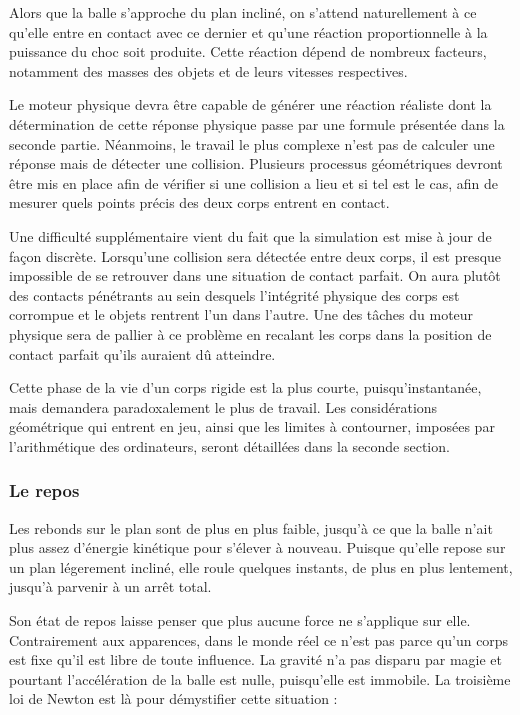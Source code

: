 Alors que la balle s'approche du plan incliné, on s'attend naturellement à ce qu'elle entre en contact avec ce dernier et qu'une réaction proportionnelle à la puissance du choc soit produite. Cette réaction dépend de nombreux facteurs, notamment des masses des objets et de leurs vitesses respectives.

Le moteur physique devra être capable de générer une réaction réaliste dont la détermination de cette réponse physique passe par une formule présentée dans la seconde partie. Néanmoins, le travail le plus complexe n'est pas de calculer une réponse mais de détecter une collision. Plusieurs processus géométriques devront être mis en place afin de vérifier si une collision a lieu et si tel est le cas, afin de mesurer quels points précis des deux corps entrent en contact.

Une difficulté supplémentaire vient du fait que la simulation est mise à jour de façon discrète. Lorsqu'une collision sera détectée entre deux corps, il est presque impossible de se retrouver dans une situation de contact parfait. On aura plutôt des contacts pénétrants au sein desquels l'intégrité physique des corps est corrompue et le objets rentrent l'un dans l'autre. Une des tâches du moteur physique sera de pallier à ce problème en recalant les corps dans la position de contact parfait qu'ils auraient dû atteindre.

Cette phase de la vie d'un corps rigide est la plus courte, puisqu'instantanée, mais demandera paradoxalement le plus de travail. Les considérations géométrique qui entrent en jeu, ainsi que les limites à contourner, imposées par l'arithmétique des ordinateurs, seront détaillées dans la seconde section.

\subsubsection{Le repos}

Les rebonds sur le plan sont de plus en plus faible, jusqu'à ce que la balle n'ait plus assez d'énergie kinétique pour s'élever à nouveau. Puisque qu'elle repose sur un plan légerement incliné, elle roule quelques instants, de plus en plus lentement, jusqu'à parvenir à un arrêt total.

Son état de repos laisse penser que plus aucune force ne s'applique sur elle. Contrairement aux apparences, dans le monde réel ce n'est pas parce qu'un corps est fixe qu'il est libre de toute influence. La gravité n'a pas disparu par magie et pourtant l'accélération de la balle est nulle, puisqu'elle est immobile. La troisième loi de Newton est là pour démystifier cette situation :

